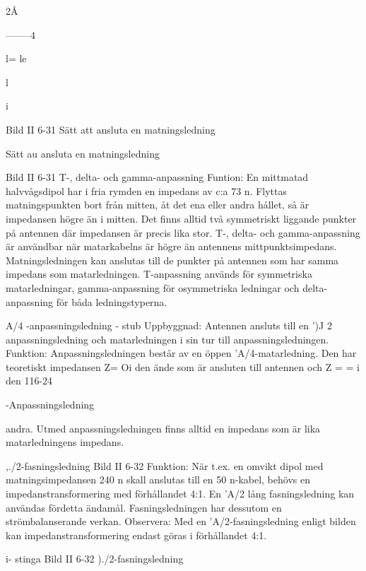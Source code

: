 {{{{2Å

--------4

l= le~

l

i

Bild II 6-31 Sätt att ansluta en matningsledning

Sätt au ansluta en matningsledning

Bild II 6-31
T-, delta- och gamma-anpassning
Funtion: En mittmatad halvvågsdipol har
i fria rymden en impedans av c:a 73 n.
Flyttas matningspunkten bort från mitten, åt det ena eller andra hållet, så är
impedansen högre än i mitten.
Det finns alltid två symmetriskt liggande
punkter på antennen där impedansen är
precis lika stor.
T-, delta- och gamma-anpassning är användbar när matarkabelns
är högre än antennens mittpunktsimpedans. Matningsledningen kan anslutas till de punkter
på antennen som har samma impedans
som matarledningen. T-anpassning används för symmetriska matarledningar, gamma-anpassning för osymmetriska ledningar
och delta-anpassning för båda ledningstyperna.

A/4 -anpassningsledning - stub
Uppbyggnad: Antennen ansluts till en ')J
2 anpassningsledning och matarledningen
i sin tur till anpassningsledningen.
Funktion: Anpassningsledningen består
av en öppen 'A/4-matarledning. Den har
teoretiskt impedansen Z= Oi den ände som
är ansluten till antennen och Z = = i den
116-24

-Anpassningsledning

andra. Utmed anpassningsledningen finns
alltid en impedans som är lika matarledningens impedans.

,./2-fasningsledning
Bild II 6-32
Funktion: När t.ex. en omvikt dipol med
matningsimpedansen 240 n skall anslutas
till en 50 n-kabel, behövs en impedanstransformering med förhållandet 4:1. En 'A/2
lång fasningsledning kan användas fördetta
ändamål. Fasningsledningen har dessutom
en strömbalanserande verkan.
Observera: Med en 'A/2-fasningsledning
enligt bilden kan impedanstransformering
endast göras i förhållandet 4:1.

i- stinga
Bild II 6-32 )./2-fasningsledning

}}}}
